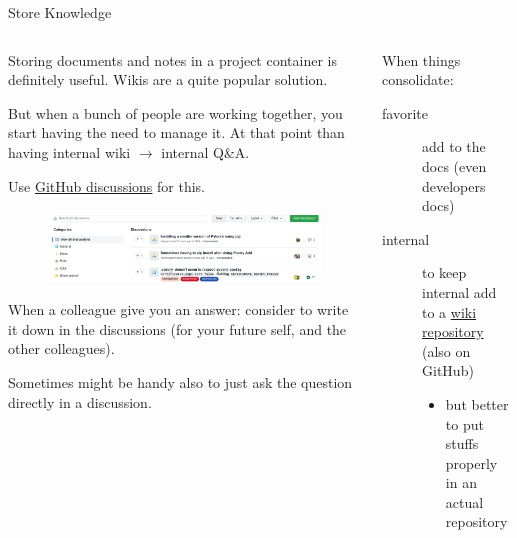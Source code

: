 \documentclass[9pt]{beamer}
\begin{document}
\begin{frame}{Store Knowledge}
    \vspace*{20pt}
    \begin{columns}
        \begin{column}{0.5\textwidth}
            Storing documents and notes in a project container is definitely
            useful. Wikis are a quite popular solution.\newline

            But when a bunch of people are working together, you start having
            the need to manage it. At that point than having internal wiki $\to$
            internal Q\&A.

            Use \href{https://docs.github.com/en/discussions}{GitHub
            discussions} for this.
            \vspace*{10pt}

            \begin{figure}
                \centering
                \includegraphics[width=\textwidth]{discussions}
            \end{figure}
            \vspace*{10pt}

            When a colleague give you an answer: consider to write it down in
            the discussions (for your future self, and the other colleagues).

            Sometimes might be handy also to just ask the question directly in
            a discussion.
        \end{column}
        \begin{column}{0.5\textwidth}
            When things consolidate:

            \begin{description}
                \item[ favorite] add to the docs (even developers docs)
                \item[internal] to keep internal add to a
                    \href{https://docs.github.com/en/communities/documenting-your-project-with-wikis/about-wikis}{wiki
                    repository} (also on GitHub)
                \begin{itemize}
                    \item but better to put stuffs properly in an actual
                        repository
                \end{itemize}
            \end{description}


\end{column}
\end{columns}
\end{frame}
\end{document}
